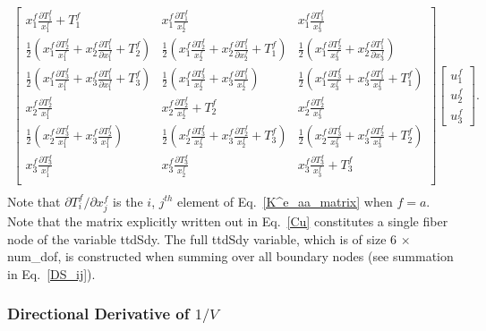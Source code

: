\begin{eqnarray}
%
\begin{bmatrix}
x_1^f \frac{\partial T_1^f}{x_1^f} + T_1^f & x_1^f \frac{\partial T_1^f}{x_2^f} & x_1^f \frac{\partial T_1^f}{x_3^f} \\
%
\frac{1}{2} \left( x_1^f \frac{\partial T_2^f}{x_1^f} + x_2^f \frac{\partial T_1^f}{\partial x_1^f} + T_2^f \right) & \frac{1}{2} \left( x_1^f \frac{\partial T_2^f}{x_2^f} + x_2^f \frac{\partial T_1^f}{\partial x_2^f} + T_1^f \right) & \frac{1}{2} \left( x_1^f \frac{\partial T_2^f}{x_3^f} + x_2^f \frac{\partial T_1^f}{\partial x_3^f} \right) \\
%
\frac{1}{2} \left( x_1^f \frac{\partial T_3^f}{x_1^f} + x_3^f \frac{\partial T_1^f}{\partial x_1^f}  +T_3^f \right) & \frac{1}{2} \left(x_1^f \frac{\partial T_3^f}{x_2^f} + x_3^f \frac{\partial T_1^f}{x_2^f} \right) & \frac{1}{2} \left( x_1^f \frac{\partial T_3^f}{x_3^f} + x_3^f \frac{\partial T_1^f}{x_3^f} + T_1^f \right)\\
%
x_2^f \frac{\partial T_2^f}{x_1^f} & x_2^f \frac{\partial T_2^f}{x_2^f} + T_2^f & x_2^f \frac{\partial T_2^f}{x_3^f} \\
%
\frac{1}{2} \left( x_2^f \frac{\partial T_3^f}{x_1^f} + x_3^f \frac{\partial T_2^f}{x_1^f} \right)& \frac{1}{2} \left( x_2^f \frac{\partial T_3^f}{x_2^f} + x_3^f \frac{\partial T_2^f}{x_2^f} + T_3^f \right) & \frac{1}{2} \left(x_2^f \frac{\partial T_3^f}{x_3^f} + x_3^f \frac{\partial T_2^f}{x_3^f} + T_2^f \right)\\
%
x_3^f \frac{\partial T_3^f}{x_1^f} & x_3^f \frac{\partial T_3^f}{x_2^f} & x_3^f \frac{\partial T_3^f}{x_3^f} + T_3^f \\
\end{bmatrix}
%
\begin{bmatrix}
u_1^f \\ u_2^f \\ u_3^f 
\end{bmatrix}. \nonumber\\ 
%
\label{Cu}
\end{eqnarray}
%
Note that $\partial T_i^f/\partial x_j^f$ is the $i$, $j^{th}$ element of Eq.\ \eqref{K^e_aa_matrix} when $f=a$. Note that the matrix explicitly written out in Eq.\ \eqref{Cu} constitutes a single fiber node of the variable ttdSdy. The full ttdSdy variable, which is of size 6 $\times$ num\_dof, is constructed when summing over all boundary nodes (see summation in Eq.\ \eqref{DS_ij}).

\subsubsection{Directional Derivative of $1/V$}

